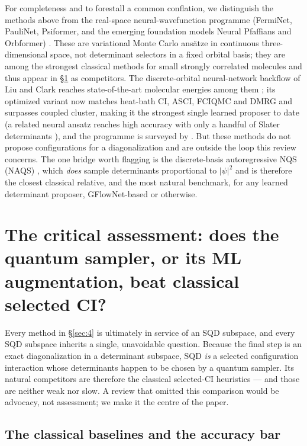 \documentclass[onecolumn,a4paper]{quantumarticle}
\begin{document}
For completeness and to forestall a common conflation, we distinguish the methods above from the real-space neural-wavefunction programme (FermiNet, PauliNet, Psiformer, and the emerging foundation models Neural Pfaffians and Orbformer) \cite{pfau2020,hermann2020,vonglehn2023,gao2024,foster2025}. These are variational Monte Carlo ans\"atze in continuous three-dimensional space, not determinant selectors in a fixed orbital basis; they are among the strongest classical methods for small strongly correlated molecules and thus appear in \S\ref{sec:5} as competitors. The discrete-orbital neural-network backflow of Liu and Clark reaches state-of-the-art molecular energies among them \cite{liuclark2024}; its optimized variant now matches heat-bath CI, ASCI, FCIQMC and DMRG and surpasses coupled cluster, making it the strongest single learned proposer to date \cite{liuclark2025} (a related neural ansatz reaches high accuracy with only a handful of Slater determinants \cite{fewdet2026}), and the programme is surveyed by \cite{hermann2023}. But these methods do not propose configurations for a diagonalization and are outside the loop this review concerns. The one bridge worth flagging is the discrete-basis autoregressive NQS (NAQS) \cite{barrett2022}, which \emph{does} sample determinants proportional to $|\psi|^2$ and is therefore the closest classical relative, and the most natural benchmark, for any learned determinant proposer, GFlowNet-based or otherwise.


\section{The critical assessment: does the quantum sampler, or its ML augmentation, beat classical selected CI?}\label{sec:5}

Every method in \S\ref{sec:4} is ultimately in service of an SQD subspace, and every SQD subspace inherits a single, unavoidable question. Because the final step is an exact diagonalization in a determinant subspace, SQD \emph{is} a selected configuration interaction whose determinants happen to be chosen by a quantum sampler. Its natural competitors are therefore the classical selected-CI heuristics --- and those are neither weak nor slow. A review that omitted this comparison would be advocacy, not assessment; we make it the centre of the paper.


\subsection{The classical baselines and the accuracy bar}\label{sec:5-1}
\end{document}
